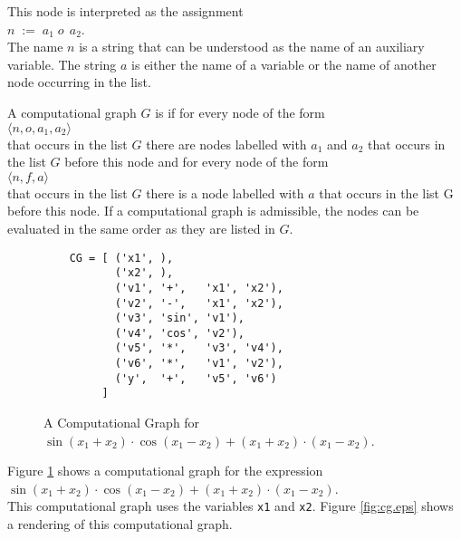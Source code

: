 \begin{Definition}
\begin{enumerate}
        This node is interpreted         as the assignment
        \\[0.2cm]
        \hspace*{1.3cm}
        $n \;\mathtt{:=}\; a_1\; o\,\; a_2$.
        \\[0.2cm]
        The name $n$ is a string that can be understood as the name of an auxiliary variable.
        The string $a$ is either the name of a variable or the name of another node occurring in the list.
 \end{enumerate}
A computational graph $G$ is  if for every node of the form
\\[0.2cm]
\hspace*{1.3cm}
$\langle n, o, a_1, a_2\rangle$
\\[0.2cm]
that occurs in the list $G$ there are nodes labelled with $a_1$ and $a_2$ that occurs in the list $G$ before this node and for
every  node of the form
\\[0.2cm]
\hspace*{1.3cm}
$\langle n, f, a\rangle$
\\[0.2cm]
that occurs in the list $G$ there is a node labelled with $a$ that occurs in the list G before this node.
If a computational graph is admissible, the nodes can be evaluated in the same order as they are listed in $G$.
\eox
\end{Definition}

\begin{figure}[!ht]
\centering
\begin{verbatim}
    CG = [ ('x1', ),
           ('x2', ),
           ('v1', '+',   'x1', 'x2'),
           ('v2', '-',   'x1', 'x2'),
           ('v3', 'sin', 'v1'),
           ('v4', 'cos', 'v2'),
           ('v5', '*',   'v3', 'v4'),
           ('v6', '*',   'v1', 'v2'),
           ('y',  '+',   'v5', 'v6')
         ]
\end{verbatim}
\vspace*{-0.3cm}
\caption{A Computational Graph for $\sin(x_1 + x_2) \cdot \cos(x_1 - x_2) + (x_1 + x_2) \cdot (x_1 - x_2)$.}
\label{fig:computational-graph}
\end{figure}
\example
Figure \ref{fig:computational-graph} shows a computational graph for the expression
\\[0.2cm]
\hspace*{1.3cm}
$\sin(x_1 + x_2) \cdot \cos(x_1 - x_2) + (x_1 + x_2) \cdot (x_1 - x_2)$.
\\[0.2cm]
This computational graph uses the variables \texttt{x1} and \texttt{x2}.
Figure \ref{fig:cg.eps} shows a rendering of this computational graph.

